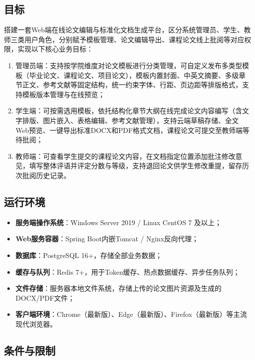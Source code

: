 \documentclass{../softeng}
\begin{document}
\subsection{目标}

搭建一套Web端在线论文编辑与标准化文档生成平台，区分系统管理员、学生、教师三类用户角色，分别赋予模板管理、论文编辑导出、课程论文线上批阅等对应权限，实现以下核心业务目标：

\begin{enumerate}
    \item 管理员端：支持按学院维度对论文模板进行分类管理，可自定义发布多类型模板（毕业论文、课程论文、项目论文），模板内置封面、中英文摘要、多级章节正文、参考文献等固定结构，统一约束字体、行距、页边距等排版格式，支持模板版本管理与在线预览；
    \item 学生端：可按需选用模板，依托结构化章节大纲在线完成论文内容编写（含文字排版、图片嵌入、表格编辑、参考文献管理），支持云端草稿存储、全文Web预览、一键导出标准DOCX和PDF格式文档，课程论文可提交至教师端等待批阅；
    \item 教师端：可查看学生提交的课程论文内容，在文档指定位置添加批注修改意见，填写整体评语并评定分数与等级，支持退回论文供学生修改重提，留存历次批阅历史记录。
\end{enumerate}

\subsection{运行环境}

\begin{itemize}
    \item \textbf{服务端操作系统}：Windows Server 2019 / Linux CentOS 7 及以上；
    \item \textbf{Web服务容器}：Spring Boot内嵌Tomcat / Nginx反向代理；
    \item \textbf{数据库}：PostgreSQL 16+，存储全部业务数据；
    \item \textbf{缓存与队列}：Redis 7+，用于Token缓存、热点数据缓存、异步任务队列；
    \item \textbf{文件存储}：服务器本地文件系统，存储上传的论文图片资源及生成的DOCX/PDF文件；
    \item \textbf{客户端环境}：Chrome（最新版）、Edge（最新版）、Firefox（最新版）等主流现代浏览器。
\end{itemize}

\subsection{条件与限制}
\end{document}
